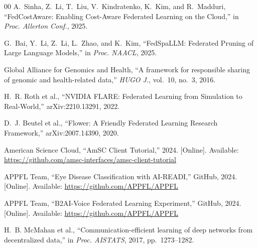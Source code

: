 \documentclass[conference]{IEEEtran}
\begin{document}
\begin{thebibliography}{00}
A.~Sinha, Z.~Li, T.~Liu, V.~Kindratenko, K.~Kim, and R.~Madduri,
``FedCostAware: Enabling Cost-Aware Federated Learning on the Cloud,''
in \emph{Proc. Allerton Conf.}, 2025.

G.~Bai, Y.~Li, Z.~Li, L.~Zhao, and K.~Kim, ``FedSpaLLM: Federated
Pruning of Large Language Models,'' in \emph{Proc. NAACL}, 2025.

Global Alliance for Genomics and Health, ``A framework for responsible
sharing of genomic and health-related data,'' \emph{HUGO J.}, vol.~10,
no.~3, 2016.

H.~R. Roth et al., ``NVIDIA FLARE: Federated Learning from Simulation
to Real-World,'' arXiv:2210.13291, 2022.

D.~J. Beutel et al., ``Flower: A Friendly Federated Learning Research
Framework,'' arXiv:2007.14390, 2020.

American Science Cloud, ``AmSC Client Tutorial,'' 2024. [Online].
Available: \url{https://github.com/amsc-interfaces/amsc-client-tutorial}

APPFL Team, ``Eye Disease Classification with AI-READI,'' GitHub, 2024.
[Online]. Available: \url{https://github.com/APPFL/APPFL}

APPFL Team, ``B2AI-Voice Federated Learning Experiment,'' GitHub, 2024.
[Online]. Available: \url{https://github.com/APPFL/APPFL}

H.~B. McMahan et al., ``Communication-efficient learning of deep
networks from decentralized data,'' in \emph{Proc. AISTATS}, 2017,
pp.~1273--1282.

\end{thebibliography}
\end{document}
